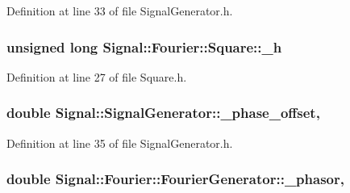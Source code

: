Definition at line 33 of file Signal\+Generator.\+h.

\hypertarget{classSignal_1_1Fourier_1_1Square_a289e48f696976033845c704970e4de80}{
\subsubsection[{\+\_\+h}]{\setlength{\rightskip}{0pt plus 5cm}unsigned long Signal\+::\+Fourier\+::\+Square\+::\+\_\+h\hspace{0.3cm}{\ttfamily [protected]}}}\label{classSignal_1_1Fourier_1_1Square_a289e48f696976033845c704970e4de80}


Definition at line 27 of file Square.\+h.

\hypertarget{classSignal_1_1SignalGenerator_a6b4444d46747c8517171edbbf4b5588f}{
\subsubsection[{\+\_\+phase\+\_\+offset}]{\setlength{\rightskip}{0pt plus 5cm}double Signal\+::\+Signal\+Generator\+::\+\_\+phase\+\_\+offset\hspace{0.3cm}{\ttfamily [protected]}, {\ttfamily [inherited]}}}\label{classSignal_1_1SignalGenerator_a6b4444d46747c8517171edbbf4b5588f}


Definition at line 35 of file Signal\+Generator.\+h.

\hypertarget{classSignal_1_1Fourier_1_1FourierGenerator_a5c5d5bb54df2a21f1a6142530adb08c3}{
\subsubsection[{\+\_\+phasor}]{\setlength{\rightskip}{0pt plus 5cm}double Signal\+::\+Fourier\+::\+Fourier\+Generator\+::\+\_\+phasor\hspace{0.3cm}{\ttfamily [protected]}, {\ttfamily [inherited]}}}\label{classSignal_1_1Fourier_1_1FourierGenerator_a5c5d5bb54df2a21f1a6142530adb08c3}


